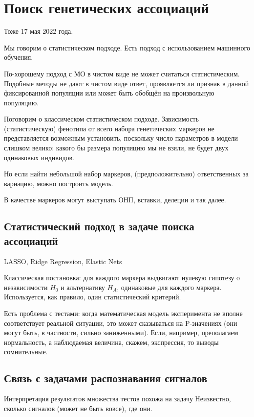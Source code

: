 \documentclass[main.tex]{sufbfiles}
\begin{document}
\section{ Поиск генетических ассоциаций }
Тоже 17 мая 2022 года.

Мы говорим о статистическом подходе.
Есть подход с использованием машинного обучения.

По-хорошему подход с МО в чистом виде не может считаться статистическим.
Подобные методы не дают в чистом виде ответ, проявляется ли признак в данной фиксированной популяции или может быть обобщён на произвольную популяцию.

Поговорим о классическом статистическом подходе.
Зависимость (статистическую) фенотипа от всего набора генетических маркеров не представляется возможным установить, поскольку число параметров в модели слишком велико: какого бы размера популяцию мы не взяли, не будет двух одинаковых индивидов.

Но если найти небольшой набор маркеров, (предположительно) ответственных за вариацию, можно построить модель.

В качестве маркеров могут выступать ОНП, вставки, делеции и так далее.

\subsection{ Статистический подход в задаче поиска ассоциаций }

LASSO, Ridge Regression, Elastic Nets

Классическая постановка: для каждого маркера выдвигают нулевую гипотезу о независимости $ H_0 $ и альтернативу $ H_A $, одинаковые для каждого маркера.
Используется, как правило, один статистический критерий.

Есть проблема с тестами: когда математическая модель эксперимента не вполне соответствует реальной ситуации, это может сказываться на P-значениях (они могут быть, в частности, сильно заниженными).
Если, например, преполагаем нормальность, а наблюдаемая величина, скажем, экспрессия, то выводы сомнительные.

\subsection{ Связь с задачами распознавания сигналов }

Интерпретация результатов множества тестов похожа на задачу 
Неизвестно, сколько сигналов (может не быть вовсе), где они.
\end{document}
